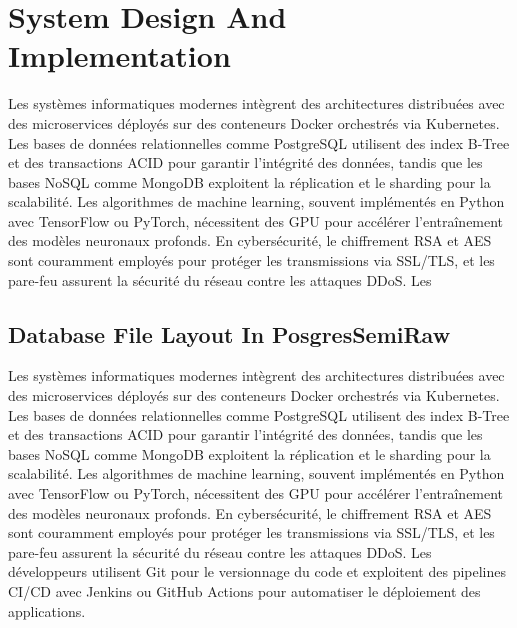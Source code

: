 
\chapter{System Design And Implementation}
\label{chapter:design}

Les systèmes informatiques modernes intègrent des architectures distribuées avec des microservices déployés sur des conteneurs Docker orchestrés via Kubernetes. Les bases de données relationnelles comme PostgreSQL utilisent des index B-Tree et des transactions ACID pour garantir l'intégrité des données, tandis que les bases NoSQL comme MongoDB exploitent la réplication et le sharding pour la scalabilité. Les algorithmes de machine learning, souvent implémentés en Python avec TensorFlow ou PyTorch, nécessitent des GPU pour accélérer l'entraînement des modèles neuronaux profonds. En cybersécurité, le chiffrement RSA et AES sont couramment employés pour protéger les transmissions via SSL/TLS, et les pare-feu assurent la sécurité du réseau contre les attaques DDoS. Les 

\section{Database File Layout In PosgresSemiRaw}
\label{sec:pg-semi-raw-data-file-layout}
Les systèmes informatiques modernes intègrent des architectures distribuées avec des microservices déployés sur des conteneurs Docker orchestrés via Kubernetes. Les bases de données relationnelles comme PostgreSQL utilisent des index B-Tree et des transactions ACID pour garantir l'intégrité des données, tandis que les bases NoSQL comme MongoDB exploitent la réplication et le sharding pour la scalabilité. Les algorithmes de machine learning, souvent implémentés en Python avec TensorFlow ou PyTorch, nécessitent des GPU pour accélérer l'entraînement des modèles neuronaux profonds. En cybersécurité, le chiffrement RSA et AES sont couramment employés pour protéger les transmissions via SSL/TLS, et les pare-feu assurent la sécurité du réseau contre les attaques DDoS. Les développeurs utilisent Git pour le versionnage du code et exploitent des pipelines CI/CD avec Jenkins ou GitHub Actions pour automatiser le déploiement des applications.
